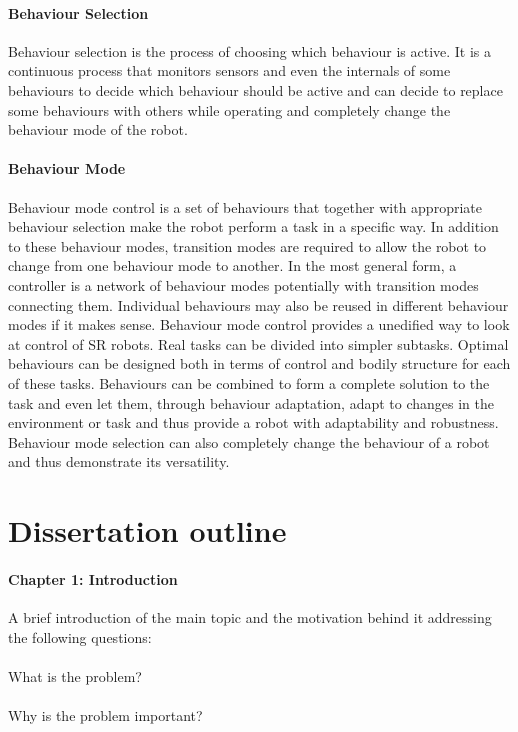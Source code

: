 \paragraph{Behaviour Selection}Behaviour selection is the process of choosing which behaviour is active. It is a continuous process that monitors sensors and even the internals of some behaviours to decide which behaviour should be active and can decide to replace some behaviours with others while operating and completely change the behaviour mode of the robot.
\paragraph{Behaviour Mode}Behaviour mode control is a set of behaviours that together with appropriate behaviour selection make the robot perform a task in a specific way. In addition to these behaviour modes, transition modes are required to allow the robot to change from one behaviour mode to another. In the most general form, a controller is a network of behaviour modes potentially with transition modes connecting them. Individual behaviours may also be reused in different behaviour modes if it makes sense. Behaviour mode control provides a unedified way to look at control of SR robots. Real tasks can be divided into simpler subtasks. Optimal behaviours can be designed both in terms of control and bodily structure for each of these tasks. Behaviours can be combined to form a complete solution to the task and even let them, through behaviour adaptation, adapt to  changes in the environment or task and thus provide a robot  with adaptability and robustness. Behaviour mode selection  can also completely change the behaviour of a robot and thus demonstrate its versatility.

\section{Dissertation outline}
\paragraph{Chapter 1: Introduction}
A brief introduction of the main topic and the motivation behind it addressing the following questions: 
\paragraph{}	What is the problem?
\paragraph{}	Why is the problem important?

